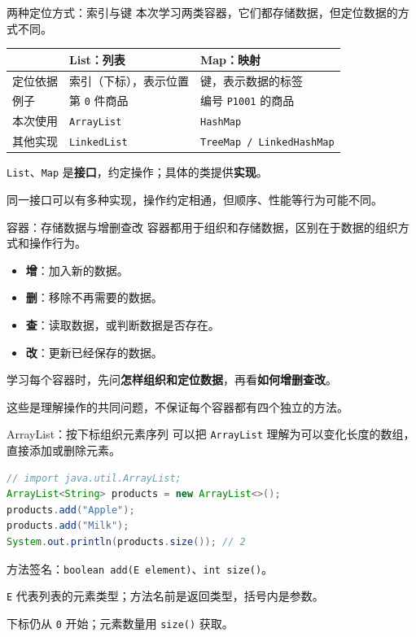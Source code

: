 \documentclass[aspectratio=169]{beamer}
\begin{document}
\begin{frame}{两种定位方式：索引与键}
  本次学习两类容器，它们都存储数据，但定位数据的方式不同。
  \par\bigskip
  \begin{center}
    \renewcommand{\arraystretch}{1.4}
    \begin{tabular}{lll}
      & \textbf{List：列表} & \textbf{Map：映射} \\
      \hline
      定位依据 & 索引（下标），表示位置 & 键，表示数据的标签 \\
      例子 & 第 \texttt{0} 件商品 & 编号 \texttt{P1001} 的商品 \\
      本次使用 & \texttt{ArrayList} & \texttt{HashMap} \\
      其他实现 & \texttt{LinkedList} & \texttt{TreeMap / LinkedHashMap} \\
    \end{tabular}
  \end{center}
  \bigskip
  \texttt{List}、\texttt{Map} 是\textbf{接口}，约定操作；具体的类提供\textbf{实现}。
  \par\medskip
  同一接口可以有多种实现，操作约定相通，但顺序、性能等行为可能不同。
\end{frame}

\begin{frame}{容器：存储数据与增删查改}
  容器都用于\alert{组织和存储数据}，区别在于数据的组织方式和操作行为。
  \par\bigskip
  \begin{itemize}
    \item \textbf{增}：加入新的数据。
    \item \textbf{删}：移除不再需要的数据。
    \item \textbf{查}：读取数据，或判断数据是否存在。
    \item \textbf{改}：更新已经保存的数据。
  \end{itemize}
  \bigskip
  学习每个容器时，先问\textbf{怎样组织和定位数据}，再看\textbf{如何增删查改}。
  \par\medskip
  这些是理解操作的共同问题，不保证每个容器都有四个独立的方法。
\end{frame}

\begin{frame}[fragile]{ArrayList：按下标组织元素序列}
  可以把 \texttt{ArrayList} 理解为\alert{可以变化长度的数组}，直接添加或删除元素。
  \begin{lstlisting}[language=Java]
// import java.util.ArrayList;
ArrayList<String> products = new ArrayList<>();
products.add("Apple");
products.add("Milk");
System.out.println(products.size()); // 2
  \end{lstlisting}
  方法签名：\texttt{boolean add(E element)}、\texttt{int size()}。
  \par\medskip
  \texttt{E} 代表列表的元素类型；方法名前是返回类型，括号内是参数。
  \par\medskip
  下标仍从 \texttt{0} 开始；元素数量用 \texttt{size()} 获取。
\end{frame}
\end{document}
